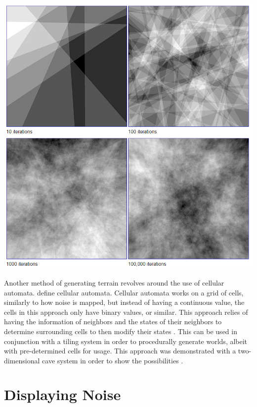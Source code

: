 \documentclass[10pt]{report}
\begin{document}
		\begin{minipage}{\textwidth}
			\centering
			\includegraphics[scale=.5]{fractal-noise}
			\label{fig:fig2}
		\end{minipage}
		
		Another method of generating terrain revolves around the use of cellular automata. define cellular automata. Cellular automata works on a grid of cells, similarly to how noise is mapped, but instead of having a continuous value, the cells in this approach only have binary values, or similar. This approach relies of having the information of neighbors and the states of their neighbors to determine surrounding cells to then modify their states \cite{nature-of-code}. This can be used in conjunction with a tiling system in order to procedurally generate worlds, albeit with pre-determined cells for usage. This approach was demonstrated with a two-dimensional cave system in order to show the possibilities \cite{10.1145/1814256.1814266}.
		
		\section{Displaying Noise}
	
\end{document}
